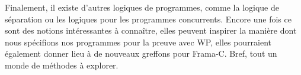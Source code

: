 \documentclass[middle]{zmdocument}
\begin{document}
Finalement, il existe d'autres logiques de programmes, comme la logique de 
séparation ou les logiques pour les programmes concurrents. Encore une fois ce
sont des notions intéressantes à connaître, elles peuvent inspirer la manière dont
nous spécifions nos programmes pour la preuve avec WP, elles pourraient également
donner lieu à de nouveaux greffons pour Frama-C. Bref, tout un monde de méthodes à
explorer.
\end{document}
